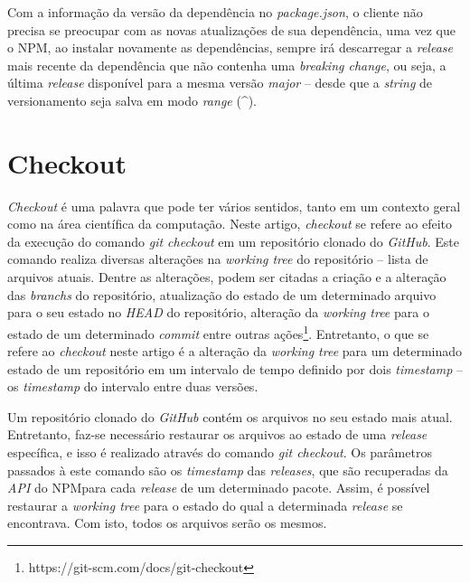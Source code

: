 Com a informação da versão da dependência no \textit{package.json}, o cliente não precisa se preocupar com as novas atualizações de sua dependência, uma vez que o \gls{NPM}, ao instalar novamente as dependências, sempre irá descarregar a \textit{release} mais recente da dependência que não contenha uma \textit{breaking change}, ou seja, a última \textit{release} disponível para a mesma versão \textit{major} -- desde que a \textit{string} de versionamento seja salva em modo \textit{range} (\textasciicircum).

\section{Checkout}
\label{ref-teo:checkout}
\textit{Checkout} é uma palavra que pode ter vários sentidos, tanto em um contexto geral como na área científica da computação. Neste artigo, \textit{checkout} se refere ao efeito da execução do comando \textit{git checkout} em um repositório clonado do \textit{GitHub}. Este comando realiza diversas alterações na \textit{working tree} do repositório -- lista de arquivos atuais. Dentre as alterações, podem ser citadas a criação e a alteração das \textit{branchs} do repositório, atualização do estado de um determinado arquivo para o seu estado no \textit{HEAD} do repositório, alteração da \textit{working tree} para o estado de um determinado \textit{commit} entre outras ações\footnote{https://git-scm.com/docs/git-checkout}. Entretanto, o que se refere ao \textit{checkout} neste artigo é a alteração da \textit{working tree} para um determinado estado de um repositório em um intervalo de tempo definido por dois \textit{timestamp} -- os \textit{timestamp} do intervalo entre duas versões.

Um repositório clonado do \textit{GitHub} contém os arquivos no seu estado mais atual. Entretanto, faz-se necessário restaurar os arquivos ao estado de uma \textit{release} específica, e isso é realizado através do comando \textit{git checkout}. Os parâmetros passados à este comando são os \textit{timestamp} das \textit{releases}, que são recuperadas da \textit{API} do \gls{NPM}\footnotemark[4] para cada \textit{release} de um determinado pacote. Assim, é possível restaurar a \textit{working tree} para o estado do qual a determinada \textit{release} se encontrava. Com isto, todos os arquivos serão os mesmos.

